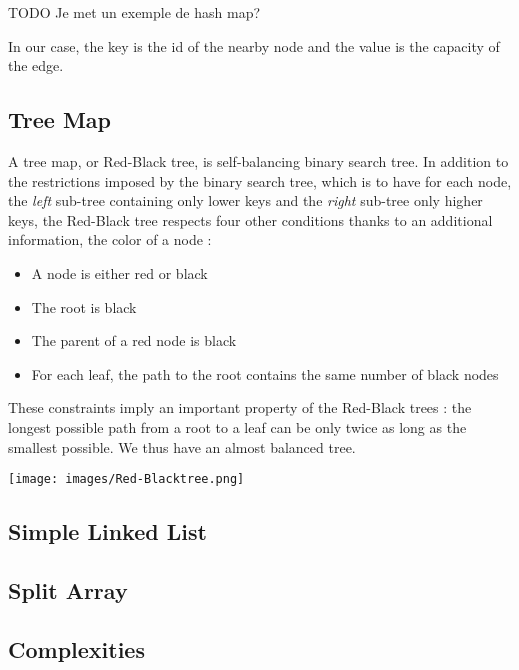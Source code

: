 TODO Je met un exemple de hash map? \newline

In our case, the key is the id of the nearby node and the value is the capacity of the edge.

\subsection{Tree Map}
A tree map, or Red-Black tree, is self-balancing binary search tree. In addition to the restrictions imposed by the binary search tree, which is to have for each node, the \textit{left} sub-tree containing only lower keys and the \textit{right} sub-tree only higher keys, the Red-Black tree respects four other conditions thanks to an additional information, the color of a node :

\begin{itemize}
\item A node is either red or black
\item The root is black
\item The parent of a red node is black
\item For each leaf, the path to the root contains the same number of black nodes
\end{itemize}

These constraints imply an important property of the Red-Black trees : the longest possible path from a root to a leaf can be only twice as long as the smallest possible. We thus have an almost balanced tree.

\begin{center}
\texttt{[image: images/Red-Blacktree.png]}
\end{center}

\subsection{Simple Linked List}

\subsection{Split Array}

\subsection{Complexities}
